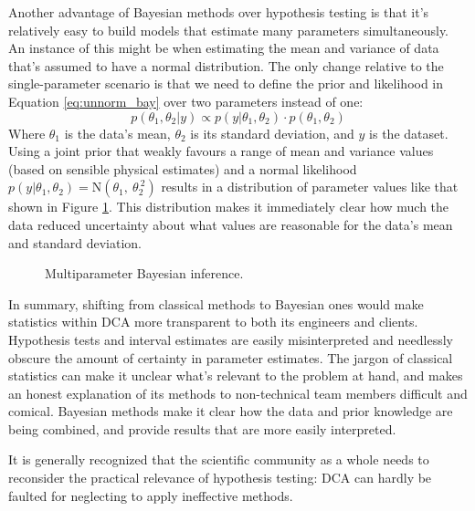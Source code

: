 \documentclass[11pt,a4paper,article]{memoir} %
\begin{document}
Another advantage of Bayesian methods over hypothesis testing is that it's relatively easy to build models that estimate many parameters simultaneously. An instance of this might be when estimating the mean and variance of data that's assumed to have a normal distribution. The only change relative to the single-parameter scenario is that we need to define the prior and likelihood in Equation \ref{eq:unnorm_bay} over two parameters instead of one:
\begin{equation}
	p(\theta_1, \theta_2 | y) \propto p(y|\theta_1, \theta_2) \cdot p(\theta_1, \theta_2)
\end{equation}
Where $\theta_1$ is the data's mean, $\theta_2$ is its standard deviation, and $y$ is the dataset. Using a joint prior that weakly favours a range of mean and variance values (based on sensible physical estimates) and a normal likelihood $p(y|\theta_1, \theta_2) = \text{N}(\theta_1, \ \theta_2^{\ 2})$ results in a distribution of parameter values like that shown in Figure \ref{fig:multiparameter_bayes}. This distribution makes it immediately clear how much the data reduced uncertainty about what values  are reasonable for the data's mean and standard deviation.
\begin{figure}
\centering
{}
\caption{Multiparameter Bayesian inference.}
\label{fig:multiparameter_bayes}
\end{figure}

In summary, shifting from classical methods to Bayesian ones would make statistics within DCA more transparent to both its engineers and clients. Hypothesis tests and interval estimates are easily misinterpreted and needlessly obscure the amount of certainty in parameter estimates. The jargon of classical statistics can make it unclear what's relevant to the problem at hand, and makes an honest explanation of its methods to non-technical team members difficult and comical. Bayesian methods make it clear how the data and prior knowledge are being combined, and provide results that are more easily interpreted.
\par
It is generally recognized that the scientific community as a whole needs to reconsider the practical relevance of hypothesis testing: DCA can hardly be faulted for neglecting to apply ineffective methods.
\end{document}

